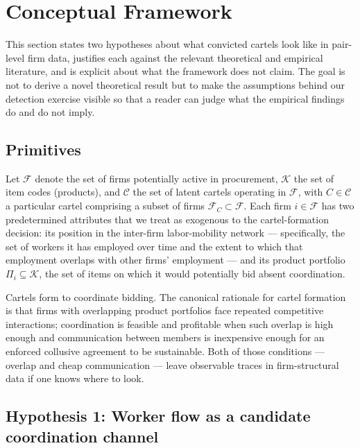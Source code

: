 \section{Conceptual Framework}\label{sec:framework}

This section states two hypotheses about what convicted cartels look like in pair-level firm data, justifies each against the relevant theoretical and empirical literature, and is explicit about what the framework does not claim. The goal is not to derive a novel theoretical result but to make the assumptions behind our detection exercise visible so that a reader can judge what the empirical findings do and do not imply.

\subsection{Primitives}

Let $\mathcal{F}$ denote the set of firms potentially active in procurement, $\mathcal{K}$ the set of item codes (products), and $\mathcal{C}$ the set of latent cartels operating in $\mathcal{F}$, with $C \in \mathcal{C}$ a particular cartel comprising a subset of firms $\mathcal{F}_C \subset \mathcal{F}$. Each firm $i \in \mathcal{F}$ has two predetermined attributes that we treat as exogenous to the cartel-formation decision: its position in the inter-firm labor-mobility network --- specifically, the set of workers it has employed over time and the extent to which that employment overlaps with other firms' employment --- and its product portfolio $\Pi_i \subseteq \mathcal{K}$, the set of items on which it would potentially bid absent coordination.

Cartels form to coordinate bidding. The canonical rationale for cartel formation \citep{stigler1964theory, green1984noncooperative} is that firms with overlapping product portfolios face repeated competitive interactions; coordination is feasible and profitable when such overlap is high enough and communication between members is inexpensive enough for an enforced collusive agreement to be sustainable. Both of those conditions --- overlap and cheap communication --- leave observable traces in firm-structural data if one knows where to look.

\subsection{Hypothesis 1: Worker flow as a candidate coordination channel}

